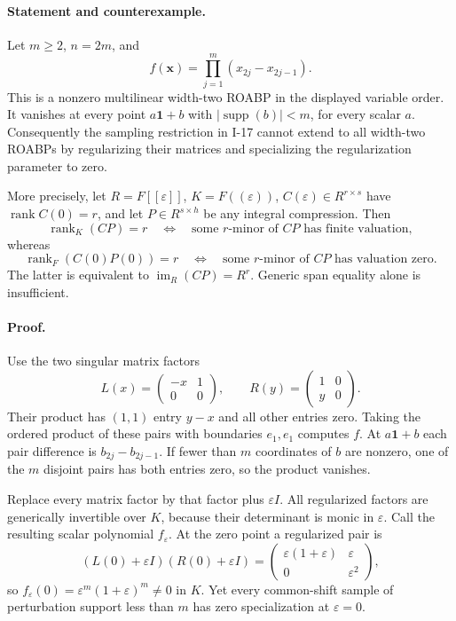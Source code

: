 \documentclass[11pt,a4paper]{article}
\theoremstyle{definition}\newtheorem{definition}{Definition}
\begin{document}
\paragraph{Statement and counterexample.}
Let $m\ge2$, $n=2m$, and
\[
 f(\mathbf x)=\prod_{j=1}^m(x_{2j}-x_{2j-1}).
\]
This is a nonzero multilinear width-two ROABP in the displayed
variable order.  It vanishes at every point $a\mathbf1+b$ with
$|\operatorname{supp}(b)|<m$, for every scalar $a$.
Consequently the sampling restriction in I-17 cannot extend to
all width-two ROABPs by regularizing their matrices and specializing
the regularization parameter to zero.

More precisely, let $R=F[[\varepsilon]]$, $K=F((\varepsilon))$,
$C(\varepsilon)\in R^{r\times s}$ have
$\operatorname{rank}C(0)=r$, and let $P\in R^{s\times h}$ be any
integral compression.  Then
\[
 \operatorname{rank}_K(CP)=r
 \quad\Longleftrightarrow\quad
 \text{some $r$-minor of $CP$ has finite valuation},
\]
whereas
\[
 \operatorname{rank}_F(C(0)P(0))=r
 \quad\Longleftrightarrow\quad
 \text{some $r$-minor of $CP$ has valuation zero}.
\tag{I.18}\label{eq:I-unit-Plucker}
\]
The latter is equivalent to $\operatorname{im}_R(CP)=R^r$.
Generic span equality alone is insufficient.

\paragraph{Proof.}
Use the two singular matrix factors
\[
 L(x)=\begin{pmatrix}-x&1\\0&0\end{pmatrix},\qquad
 R(y)=\begin{pmatrix}1&0\\y&0\end{pmatrix}.
\]
Their product has $(1,1)$ entry $y-x$ and all other entries zero.
Taking the ordered product of these pairs with boundaries $e_1,e_1$
computes $f$.  At $a\mathbf1+b$ each pair difference is
$b_{2j}-b_{2j-1}$.  If fewer than $m$ coordinates of $b$ are
nonzero, one of the $m$ disjoint pairs has both entries zero,
so the product vanishes.

Replace every matrix factor by that factor plus $\varepsilon I$.
All regularized factors are generically invertible over $K$,
because their determinant is monic in $\varepsilon$.
Call the resulting scalar polynomial $f_\varepsilon$.
At the zero point a regularized pair is
\[
 (L(0)+\varepsilon I)(R(0)+\varepsilon I)
  =\begin{pmatrix}\varepsilon(1+\varepsilon)&\varepsilon\\
                   0&\varepsilon^2\end{pmatrix},
\]
so $f_\varepsilon(0)=\varepsilon^m(1+\varepsilon)^m\ne0$ in $K$.
Yet every common-shift sample of perturbation support less than $m$
has zero specialization at $\varepsilon=0$.
\end{document}
